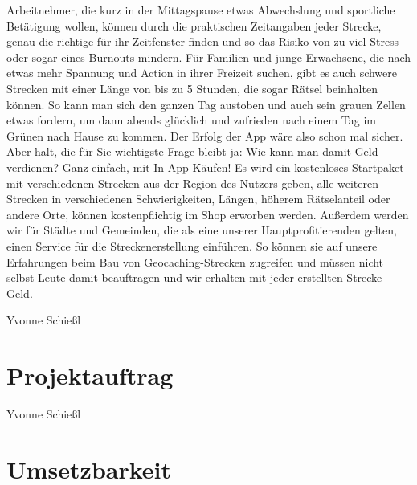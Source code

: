 \documentclass[a4paper, 12pp]{article}
\begin{document}
Arbeitnehmer, die kurz in der Mittagspause etwas Abwechslung und sportliche Betätigung wollen, können durch die praktischen Zeitangaben jeder Strecke, genau die richtige für ihr Zeitfenster finden und so das Risiko von zu viel Stress oder sogar eines Burnouts mindern.\newline
Für Familien und junge Erwachsene, die nach etwas mehr Spannung und Action in ihrer Freizeit suchen, gibt es auch schwere Strecken mit einer Länge von bis zu 5 Stunden, die sogar Rätsel beinhalten können. So kann man sich den ganzen Tag austoben und auch sein grauen Zellen etwas fordern, um dann abends glücklich und zufrieden nach einem Tag im Grünen nach Hause zu kommen.\newline
Der Erfolg der App wäre also schon mal sicher. Aber halt, die für Sie wichtigste Frage bleibt ja: Wie kann man damit Geld verdienen? Ganz einfach, mit In-App Käufen!\newline
Es wird ein kostenloses Startpaket mit verschiedenen Strecken aus der Region des Nutzers geben, alle weiteren Strecken in verschiedenen Schwierigkeiten, Längen, höherem Rätselanteil oder andere Orte, können kostenpflichtig im Shop erworben werden. Außerdem werden wir für Städte und Gemeinden, die als eine unserer Hauptprofitierenden gelten, einen Service für die Streckenerstellung einführen. So können sie auf unsere Erfahrungen beim Bau von Geocaching-Strecken zugreifen und müssen nicht selbst Leute damit beauftragen und wir erhalten mit jeder erstellten Strecke Geld.

Yvonne Schießl

\section{Projektauftrag}
\begin{figure}[H] 
	\begin{minipage}{17cm} 
	\end{minipage}
\end{figure}

\begin{figure}[H] 
	\begin{minipage}{17cm} 
	\end{minipage}
\end{figure}

Yvonne Schießl

\section{Umsetzbarkeit}
\end{document}

